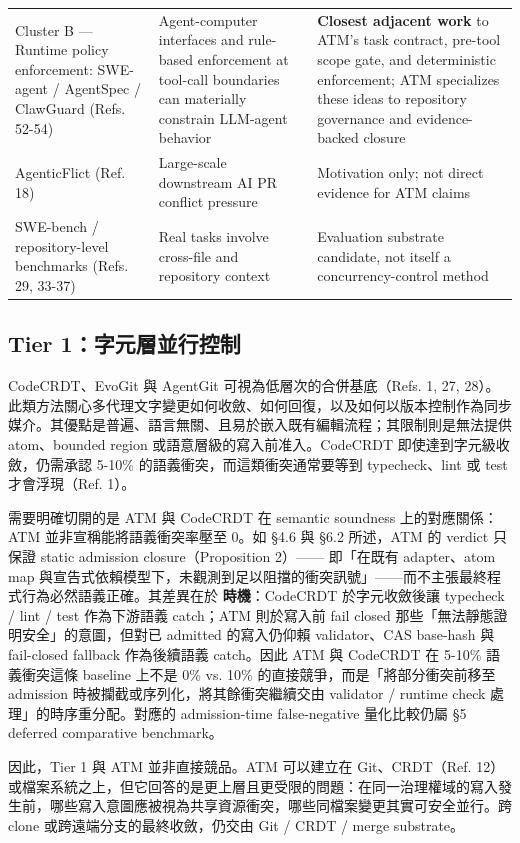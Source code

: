 \documentclass[a4paper,fontset=none]{ctexart}
\begin{document}
\begin{longtable}{L{0.28\textwidth}L{0.28\textwidth}L{0.28\textwidth}}
Cluster B --- Runtime policy enforcement: SWE-agent / AgentSpec / ClawGuard (Refs. 52-54) & Agent-computer interfaces and rule-based enforcement at tool-call boundaries can materially constrain LLM-agent behavior & \textbf{Closest adjacent work} to ATM's task contract, pre-tool scope gate, and deterministic enforcement; ATM specializes these ideas to repository governance and evidence-backed closure \\
AgenticFlict (Ref. 18) & Large-scale downstream AI PR conflict pressure & Motivation only; not direct evidence for ATM claims \\
SWE-bench / repository-level benchmarks (Refs. 29, 33-37) & Real tasks involve cross-file and repository context & Evaluation substrate candidate, not itself a concurrency-control method \\
\bottomrule
\end{longtable}
\endgroup

\subsection{Tier 1：字元層並行控制}

CodeCRDT、EvoGit 與 AgentGit 可視為低層次的合併基底（Refs. 1, 27, 28）。此類方法關心多代理文字變更如何收斂、如何回復，以及如何以版本控制作為同步媒介。其優點是普遍、語言無關、且易於嵌入既有編輯流程；其限制則是無法提供 atom、bounded region 或語意層級的寫入前准入。CodeCRDT 即使達到字元級收斂，仍需承認 5-10\% 的語義衝突，而這類衝突通常要等到 typecheck、lint 或 test 才會浮現（Ref. 1）。

需要明確切開的是 ATM 與 CodeCRDT 在 semantic soundness 上的對應關係：ATM 並非宣稱能將語義衝突率壓至 0。如 §4.6 與 §6.2 所述，ATM 的 \texttt{} verdict 只保證 static admission closure（Proposition 2）------ 即「在既有 adapter、atom map 與宣告式依賴模型下，未觀測到足以阻擋的衝突訊號」------而不主張最終程式行為必然語義正確。其差異在於 \textbf{時機}：CodeCRDT 於字元收斂後讓 typecheck / lint / test 作為下游語義 catch；ATM 則於寫入前 fail closed 那些「無法靜態證明安全」的意圖，但對已 admitted 的寫入仍仰賴 validator、CAS base-hash 與 fail-closed fallback 作為後續語義 catch。因此 ATM 與 CodeCRDT 在 5-10\% 語義衝突這條 baseline 上不是 0\% vs. 10\% 的直接競爭，而是「將部分衝突前移至 admission 時被攔截或序列化，將其餘衝突繼續交由 validator / runtime check 處理」的時序重分配。對應的 admission-time false-negative 量化比較仍屬 §5 deferred comparative benchmark。

因此，Tier 1 與 ATM 並非直接競品。ATM 可以建立在 Git、CRDT（Ref. 12）或檔案系統之上，但它回答的是更上層且更受限的問題：在同一治理權域的寫入發生前，哪些寫入意圖應被視為共享資源衝突，哪些同檔案變更其實可安全並行。跨 clone 或跨遠端分支的最終收斂，仍交由 Git / CRDT / merge substrate。
\end{document}
